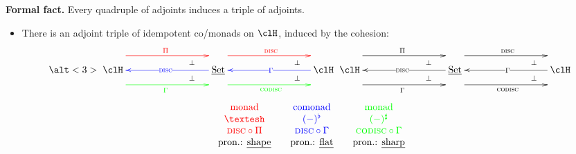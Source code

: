 \documentclass[presentation]{beamer}
\begin{document}
\begin{frame}
	\begin{block}{}
		\textbf{Formal fact.} Every quadruple of adjoints induces a triple of adjoints.
	\end{block}
	\begin{itemize}
		\item<2-> There is an adjoint triple of idempotent co/monads on $\clH$, induced by the cohesion:
		      \[
			      \alt<3>{
			      \xymatrix@C=3cm{
			      \clH
			      \ar@{}@<8pt>[r]|(.75)\perp
			      \ar@{}@<-8pt>[r]|(.75)\perp
			      \ar@[red]@<15pt>[r]^{\color{red}\Pi}
			      \ar@[blue]@{<-}[r]|{\color{blue}\disc}
			      \ar@[green]@<-15pt>[r]_{\color{green}\Gamma}
			      &
			      \Set
			      \ar@{}@<8pt>[r]|(.75)\perp
			      \ar@{}@<-8pt>[r]|(.75)\perp
			      \ar@[red]@<15pt>[r]^{\color{red}\disc}
			      \ar@[blue]@{<-}[r]|{\color{blue}\Gamma}
			      \ar@[green]@<-15pt>[r]_{\color{green}\codisc}
			      &
			      \clH}
			      }{\xymatrix@C=3cm{
			      \clH
			      \ar@{}@<8pt>[r]|(.75)\perp
			      \ar@{}@<-8pt>[r]|(.75)\perp
			      \ar@<15pt>[r]^\Pi
			      \ar@{<-}[r]|\disc
			      \ar@<-15pt>[r]_\Gamma &
			      \Set
			      \ar@{}@<8pt>[r]|(.75)\perp
			      \ar@{}@<-8pt>[r]|(.75)\perp
			      \ar@<15pt>[r]^\disc
			      \ar@{<-}[r]|\Gamma
			      \ar@<-15pt>[r]_\codisc & \clH
			      }}
		      \]
		      \onslide<3->
		      \[
			      \begin{array}{ccccc}
				      {\color{red}\text{monad}}    &  &
				      {\color{blue}\text{comonad}} &  &
				      {\color{green}\text{monad}}                                           \\

				      {\color{red}\shape}          &  &
				      {\color{blue}(-)^\flat}      &  &
				      {\color{green}(-)^\sharp}                                             \\

				      {\color{red}\disc\circ\Pi}
				                                   &  & {\color{blue}\disc\circ\Gamma} &  &
				      {\color{green}\codisc\circ\Gamma}                                     \\

				      \text{pron.: \emph{shape}}   &  &
				      \text{pron.: \emph{flat}}    &  &
				      \text{pron.: \emph{sharp}}
			      \end{array}
		      \]
	\end{itemize}
\end{frame}
\end{document}
